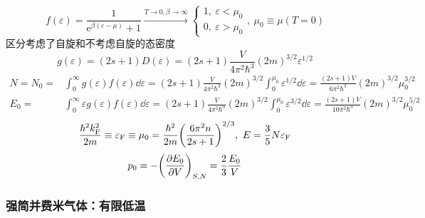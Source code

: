 \[
    f(\varepsilon) = \frac{1}{\mathrm{e}^{\beta (\varepsilon - \mu)} + 1} \xrightarrow{T \to 0, \beta \to \infty} \begin{cases}
        1,\ \varepsilon < \mu_0 \\
        0,\ \varepsilon > \mu_0
    \end{cases},\ \mu_0 \equiv \mu(T = 0)
\] 区分考虑了自旋和不考虑自旋的态密度 \[
    g(\varepsilon) = (2 s + 1) D(\varepsilon) = (2 s + 1) \frac{V}{4 \pi^2 \hbar^3} (2 m)^{3/2} \varepsilon^{1/2}
\] \begin{align*}
    N = N_0 = & \int_{0}^{\infty} g(\varepsilon) f(\varepsilon) \dd{\varepsilon} = (2 s + 1) \frac{V}{4 \pi^2 \hbar^3} (2 m)^{3/2} \int_{0}^{\mu_0} \varepsilon^{1/2} \dd{\varepsilon} = \frac{(2 s + 1) V}{6 \pi^2 \hbar^3} (2 m)^{3 / 2} \mu_{0}^{3/2}          \\
    E_0 =     & \int_{0}^{\infty} \varepsilon g(\varepsilon) f(\varepsilon) \dd{\varepsilon} = (2 s + 1) \frac{V}{4 \pi^2 \hbar^3} (2 m)^{3/2} \int_{0}^{\mu_0} \varepsilon^{3/2} \dd{\varepsilon} = \frac{(2 s + 1) V}{10 \pi^2 \hbar^3} (2 m)^{3/2} \mu_0^{5/2}
\end{align*} \[
    \frac{\hbar^2 k_{\text{F}}^2}{2 m} \equiv \varepsilon_{\text{F}} \equiv \mu_0 = \frac{\hbar^2}{2 m} \qty(\frac{6 \pi^2 n}{2 s + 1})^{2/3},\ E = \frac{3}{5} N \varepsilon_{\text{F}}
\] \[
    p_0 = - \qty(\pdv{E_0}{V})_{S, N} = \frac{2}{3} \frac{E_0}{V}
\]

\subsubsection{强简并费米气体：有限低温}

